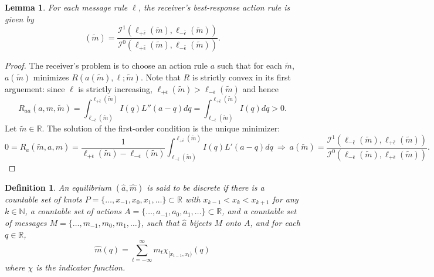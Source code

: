 \documentclass[12pt]{article}
\newtheorem{lemma}{Lemma}
\newtheorem{definition}{Definition}
\begin{document}
\begin{lemma}
For each message rule $\ell$, the receiver's best-response action rule is given by
\begin{equation}
[\mathcal{R}(\ell)](\tilde{m})=\frac{\mathcal{I}^{1}(\ell_{+\bar{\epsilon}}(\tilde{m}),\ell_{-\bar{\epsilon}}(\tilde{m}))}{\mathcal{I}^{0}(\ell_{+\bar{\epsilon}}(\tilde{m}),\ell_{-\bar{\epsilon}}(\tilde{m}))}.
\end{equation}
\end{lemma}
\begin{proof}
The receiver's problem is to choose an action rule $a$ such that for each $\tilde{m}$, $a(\tilde{m})$ minimizes $R(a(\tilde{m}),\ell;\tilde{m})$. Note that $R$ is strictly convex in its first arguement: since $\ell$ is strictly increasing, $\ell_{+\bar{\epsilon}}(\tilde{m})>\ell_{-\bar{\epsilon}}(\tilde{m})$ and hence
\begin{equation}
R_{aa}(a,m,\tilde{m})=\int_{\ell_{-\bar{\epsilon}}(\tilde{m})}^{\ell_{+\bar{\epsilon}}(\tilde{m})}{I(q)L''(a-q)dq}=\int_{\ell_{-\bar{\epsilon}}(\tilde{m})}^{\ell_{+\bar{\epsilon}}(\tilde{m})}{I(q)dq}>0.
\end{equation}
Let $\tilde{m}\in\mathbb{R}$. The solution of the first-order condition is the unique minimizer:
\begin{equation}
0=R_{a}(\tilde{m},a,m)=\frac{1}{\ell_{+\bar{\epsilon}}(\tilde{m})-\ell_{-\bar{\epsilon}}(\tilde{m})}\int_{\ell_{-\bar{\epsilon}}(\tilde{m})}^{\ell_{+\bar{\epsilon}}(\tilde{m})}{I(q)L'(a-q)dq}\:\Rightarrow\:a(\tilde{m})=\frac{\mathcal{I}^{1}(\ell_{-\bar{\epsilon}}(\tilde{m}),\ell_{+\bar{\epsilon}}(\tilde{m}))}{\mathcal{I}^{0}(\ell_{-\bar{\epsilon}}(\tilde{m}),\ell_{+\bar{\epsilon}}(\tilde{m}))}.
\end{equation}
\end{proof}

\begin{definition}
An equilibrium $(\hat{a},\hat{m})$ is said to be discrete if there is a countable set of knots $P=\{\ldots,x_{-1},x_{0},x_{1},\ldots\}\subset\mathbb{R}$ with $x_{k-1}<x_{k}<x_{k+1}$ for any $k\in\mathbb{N}$, a countable set of actions $A=\{\ldots,a_{-1},a_{0},a_{1},\ldots\}\subset\mathbb{R}$, and a countable set of messages $M=\{\ldots,m_{-1},m_{0},m_{1},\ldots\}$, such that $\hat{a}$ bijects $M$ onto $A$, and for each $q\in\mathbb{R}$,
\begin{equation*}
\hat{m}(q)=\sum_{t=-\infty}^{\infty}m_{t}\chi_{[x_{t-1},x_{t})}(q)
\end{equation*}
where $\chi$ is the indicator function.
\end{definition}
\end{document}
